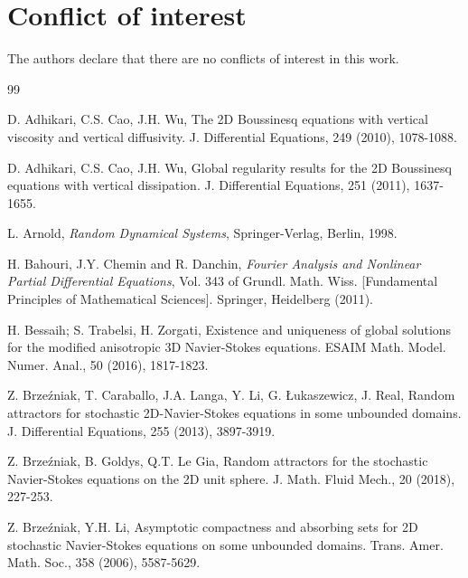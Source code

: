 \documentclass{elsarticle}
\theoremstyle{definition}
\numberwithin{equation}{section}
\begin{document}
\section*{Conflict of interest}
The authors declare that there are no conflicts of interest in this work.



\begin{thebibliography}{99}

D. Adhikari, C.S. Cao, J.H. Wu,  The 2D Boussinesq equations with vertical viscosity and vertical diffusivity. J. Differential Equations, 249 (2010), 1078-1088.

D. Adhikari, C.S. Cao, J.H. Wu,  Global regularity results for the 2D Boussinesq equations with vertical dissipation. J. Differential Equations, 251 (2011), 1637-1655.

 L. Arnold,   {\em Random Dynamical Systems}, Springer-Verlag, Berlin, 1998.

H. Bahouri, J.Y. Chemin and R. Danchin,  {\em Fourier Analysis and Nonlinear Partial Differential Equations},  Vol. 343 of Grundl. Math. Wiss. [Fundamental Principles of Mathematical Sciences]. Springer, Heidelberg (2011).

 H. Bessaih; S. Trabelsi, H. Zorgati, Existence and uniqueness of global solutions for the modified anisotropic 3D Navier-Stokes equations. ESAIM Math. Model. Numer. Anal., 50 (2016),  1817-1823.

 Z. Brze\'{z}niak, T. Caraballo, J.A. Langa, Y. Li, G. {\L}ukaszewicz, J. Real,   Random attractors for stochastic 2D-Navier-Stokes equations in some unbounded domains. J. Differential Equations, 255 (2013), 3897-3919.






 Z. Brze\'{z}niak, B. Goldys, Q.T. Le Gia,  Random attractors for the stochastic Navier-Stokes equations on the 2D unit sphere. J. Math. Fluid Mech., 20 (2018), 227-253.



Z. Brze\'{z}niak, Y.H. Li,    Asymptotic compactness and absorbing sets for 2D stochastic Navier-Stokes equations on some unbounded domains. Trans. Amer. Math. Soc., 358 (2006), 5587-5629.




\end{thebibliography}
\end{document}
